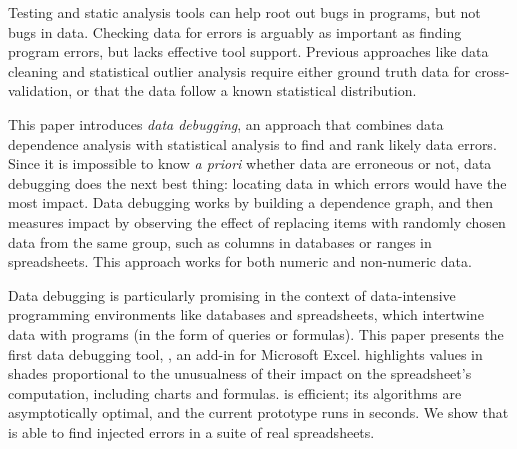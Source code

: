 Testing and static analysis tools can help root out bugs in programs,
but not bugs in data. Checking data for errors is arguably as
important as finding program errors, but lacks effective tool
support. Previous approaches like data cleaning and statistical
outlier analysis require either ground truth data for
cross-validation, or that the data follow a known statistical
distribution.

This paper introduces \emph{data debugging}, an approach that combines
data dependence analysis with statistical analysis to find and
rank likely data errors. Since it is impossible to know \emph{a
priori} whether data are erroneous or not, data debugging does the
next best thing: locating data in which errors would have the most
impact. Data debugging works by building a dependence graph, and then
measures impact by observing the effect of replacing items with
randomly chosen data from the same group, such as columns in databases
or ranges in spreadsheets. This approach works for both numeric and non-numeric data.

Data debugging is particularly promising in the context of
data-intensive programming environments like databases and
spreadsheets, which intertwine data with programs (in the form of
queries or formulas). This paper presents the first data debugging
tool, \checkcell{}, an add-in for Microsoft Excel. \checkcell{}
highlights values in shades proportional to the unusualness
of their impact on the spreadsheet's computation, including charts and
formulas. \checkcell{} is efficient; its algorithms are asymptotically
optimal, and the current prototype runs in seconds. We show
that \checkcell{} is able to find injected errors in a suite of real
spreadsheets.

